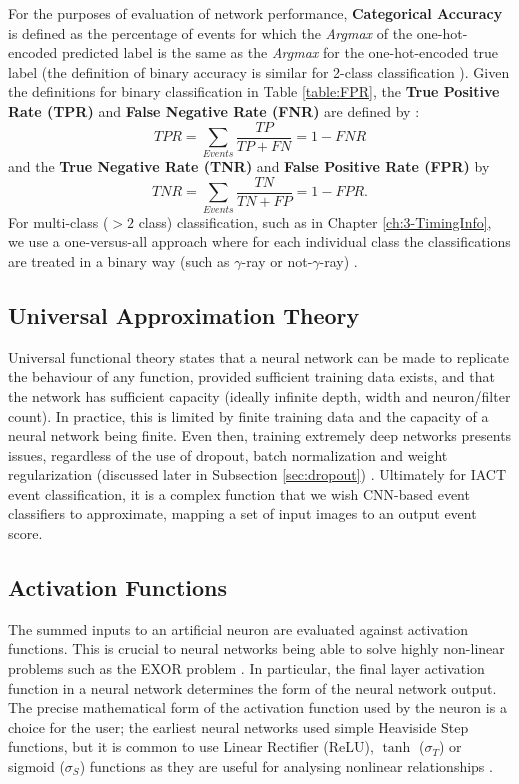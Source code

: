 For the purposes of evaluation of network performance, \textbf{Categorical Accuracy} \cite{Keras} is defined as the percentage of events for which the \textit{Argmax} of the one-hot-encoded predicted label is the same as the \textit{Argmax} for the one-hot-encoded true label (the definition of binary accuracy is similar for 2-class classification \cite{Keras}). Given the definitions for binary classification in Table \ref{table:FPR}, the \textbf{True Positive Rate (TPR)} and \textbf{False Negative Rate (FNR)} are defined by \cite{fawcett}:
\begin{equation}
    TPR=\sum_{Events}\frac{TP}{TP+FN}=1-FNR
\end{equation}
and the \textbf{True Negative Rate (TNR)} and \textbf{False Positive Rate (FPR)} by
\begin{equation}
    TNR=\sum_{Events}\frac{TN}{TN+FP}=1-FPR.
\end{equation} For multi-class ($>2$ class) classification, such as in Chapter \ref{ch:3-TimingInfo}, we use a one-versus-all approach where for each individual class the classifications are treated in a binary way (such as $\gamma$-ray or not-$\gamma$-ray) \cite{fawcett,scikit}. 

\subsection{Universal Approximation Theory}
Universal functional theory states that a neural network can be made to replicate the behaviour of any function, provided sufficient training data exists, and that the network has sufficient capacity (ideally infinite depth, width and neuron/filter count). In practice, this is limited by finite training data and the capacity of a neural network being finite. Even then, training extremely deep networks presents issues, regardless of the use of dropout, batch normalization and weight regularization (discussed later in Subsection \ref{sec:dropout}) \cite{deepdifficult}. Ultimately for IACT event classification, it is a complex function that we wish CNN-based event classifiers to approximate, mapping a set of input images to an output event score. 

\subsection{Activation Functions}

The summed inputs to an artificial neuron are evaluated against activation functions. This is crucial to neural networks being able to solve highly non-linear problems such as the EXOR problem \cite{universal}. In particular, the final layer activation function in a neural network determines the form of the neural network output. The precise mathematical form of the activation function used by the neuron is a choice for the user; the earliest neural networks used simple Heaviside Step functions, but 
it is common to use Linear Rectifier (ReLU), $\tanh$ ($\sigma_T$) or sigmoid ($\sigma_S$) functions as they are useful for analysing nonlinear relationships \cite{C++CNN,Keras}. 

